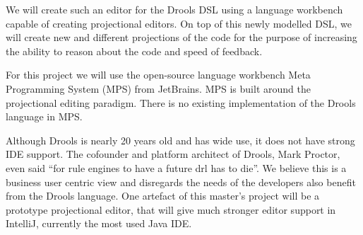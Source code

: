 We will create such an editor for the Drools DSL using a language workbench capable of creating projectional editors.  
On top of this newly modelled DSL, we will create new and different projections of the code for the purpose of increasing the ability to reason about the code and speed of feedback. 

For this project we will use the open-source language workbench Meta Programming System (MPS) from JetBrains\cite{MPS_ProductPage}.
MPS is built around the projectional editing paradigm.
There is no existing implementation of the Drools language in MPS.

Although Drools is nearly 20 years old and has wide use, it does not have strong IDE support.
The cofounder and platform architect of Drools, Mark Proctor, even said ``for rule engines to have a future drl has to die''\cite{Proctor_happenings}.
We believe this is a business user centric view and disregards the needs of the developers also benefit from the Drools language.
One artefact of this master's project will be a prototype projectional editor, that will give much stronger editor support in IntelliJ, currently the most used Java IDE\cite{Java_usage_report}.
